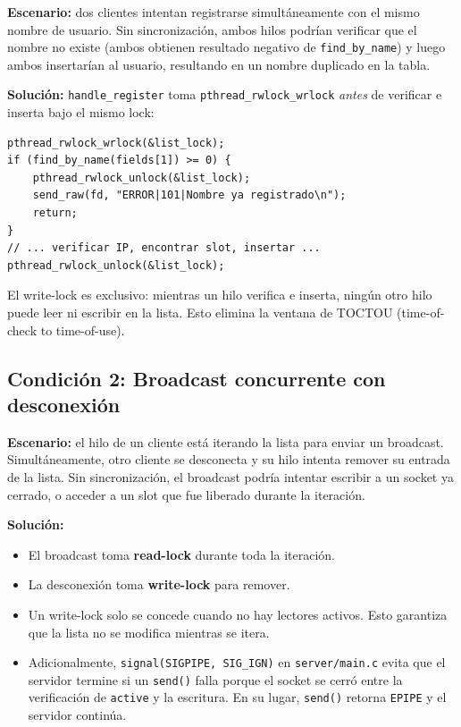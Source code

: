 \documentclass[12pt,a4paper]{article}
\begin{document}
\textbf{Escenario:} dos clientes intentan registrarse simultáneamente con el mismo
nombre de usuario.  Sin sincronización, ambos hilos podrían verificar que el nombre
no existe (ambos obtienen resultado negativo de \texttt{find\_by\_name}) y luego
ambos insertarían al usuario, resultando en un nombre duplicado en la tabla.

\textbf{Solución:} \texttt{handle\_register} toma \texttt{pthread\_rwlock\_wrlock}
\textit{antes} de verificar e inserta bajo el mismo lock:

\begin{lstlisting}[caption={Atomicidad de verificación e inserción en registro}]
pthread_rwlock_wrlock(&list_lock);
if (find_by_name(fields[1]) >= 0) {
    pthread_rwlock_unlock(&list_lock);
    send_raw(fd, "ERROR|101|Nombre ya registrado\n");
    return;
}
// ... verificar IP, encontrar slot, insertar ...
pthread_rwlock_unlock(&list_lock);
\end{lstlisting}

El write-lock es exclusivo: mientras un hilo verifica e inserta, ningún otro hilo
puede leer ni escribir en la lista.  Esto elimina la ventana de TOCTOU
(time-of-check to time-of-use).

\subsection{Condición 2: Broadcast concurrente con desconexión}

\textbf{Escenario:} el hilo de un cliente está iterando la lista para enviar un
broadcast.  Simultáneamente, otro cliente se desconecta y su hilo intenta remover
su entrada de la lista.  Sin sincronización, el broadcast podría intentar escribir a
un socket ya cerrado, o acceder a un slot que fue liberado durante la iteración.

\textbf{Solución:}

\begin{itemize}[nosep]
    \item El broadcast toma \textbf{read-lock} durante toda la iteración.
    \item La desconexión toma \textbf{write-lock} para remover.
    \item Un write-lock solo se concede cuando no hay lectores activos.  Esto
          garantiza que la lista no se modifica mientras se itera.
    \item Adicionalmente, \texttt{signal(SIGPIPE, SIG\_IGN)} en \texttt{server/main.c}
          evita que el servidor termine si un \texttt{send()} falla porque el
          socket se cerró entre la verificación de \texttt{active} y la escritura.
          En su lugar, \texttt{send()} retorna \texttt{EPIPE} y el servidor
          continúa.
\end{itemize}
\end{document}
